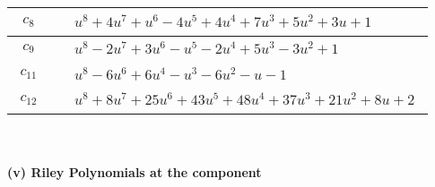 \documentclass[1p]{elsarticle_modified}
\theoremstyle{definition}
\begin{document}
\begin{tabular}{m{50pt}|m{274pt}}
\hline $$\begin{aligned}c_{8}\end{aligned}$$&$\begin{aligned}
&u^8+4 u^7+u^6-4 u^5+4 u^4+7 u^3+5 u^2+3 u+1
\end{aligned}$\\
\hline $$\begin{aligned}c_{9}\end{aligned}$$&$\begin{aligned}
&u^8-2 u^7+3 u^6- u^5-2 u^4+5 u^3-3 u^2+1
\end{aligned}$\\
\hline $$\begin{aligned}c_{11}\end{aligned}$$&$\begin{aligned}
&u^8-6 u^6+6 u^4- u^3-6 u^2- u-1
\end{aligned}$\\
\hline $$\begin{aligned}c_{12}\end{aligned}$$&$\begin{aligned}
&u^8+8 u^7+25 u^6+43 u^5+48 u^4+37 u^3+21 u^2+8 u+2
\end{aligned}$\\
\hline
\end{tabular}\\~\\
\newpage\renewcommand{\arraystretch}{1}
\flushleft \textbf{(v) Riley Polynomials at the component}\newline \\
\end{document}

